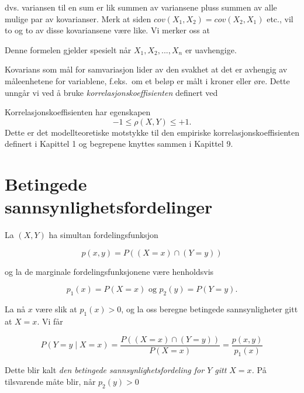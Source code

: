 \noindent dvs. variansen til en sum er lik summen av variansene pluss
summen av alle mulige par av kovarianser. Merk at siden
$cov(X_1, X_2)=cov(X_2, X_1)$ etc., vil to og to av disse
kovariansene være like. Vi merker oss at

\begin{center} \framebox[10cm]{\begin{minipage}{9cm}
\[ \mbox{V11. \ } var(\sum_{i=1}^n X_i)= \sum_{i=1}^n var(X_i)
             \mbox{\ \ såframt \ } cov(X_i,X_j)=0   \]
\mbox{}\end{minipage}} \end{center}

\noindent Denne formelen gjelder spesielt når $X_1, X_2, ..., X_n$ er
uavhengige.

Kovarians som mål for samvariasjon lider av den svakhet at det
er avhengig av måleenhetene for variablene, f.eks.\ om et beløp
er målt i kroner eller øre. Dette unngår vi ved å bruke 
{\em korrelasjonskoeffisienten} definert ved
\begin{center} \framebox[10cm]{\begin{minipage}{9cm}
\[  \mbox{C5.\ \ \ \ \ } \rho (X,Y)=\frac{cov(X,Y)}{\sqrt{varX} \cdot \sqrt{varY}} \]
\mbox{}\end{minipage}} \end{center}
Korrelasjonskoeffisienten har egenskapen
\[     -1\leq \rho (X,Y)\leq +1.      \]
Dette er det modellteoretiske motstykke til den empiriske
korrelasjonskoef\-fisienten definert i Kapittel 1 og begrepene knyttes
sammen i Kapittel 9.

\section{Betingede sannsynlighetsfordelinger}

La $(X,Y)$ ha simultan fordelingsfunksjon

\[   p(x,y)=P((X=x)\cap (Y=y))\]

\noindent og la de marginale fordelingsfunksjonene være henholdsvis


\[     p_1(x)=P(X=x) \mbox{\ \ og \ \   } p_2(y)=P(Y=y). \]

\noindent La nå $x$ være slik at $p_1(x)>0$, og la oss beregne
 betingede sannsynligheter gitt at $X=x$. Vi får

\[ P(Y=y \mid X=x)=\frac{P((X=x)\cap (Y=y))}{P(X=x)}=\frac{p(x,y)}{p_1(x)} \]

\noindent Dette blir kalt {\em den betingede sannsynlighetsfordeling for
$Y$ gitt $X=x$.} På tilsvarende måte blir, når $p_2(y)>0$

